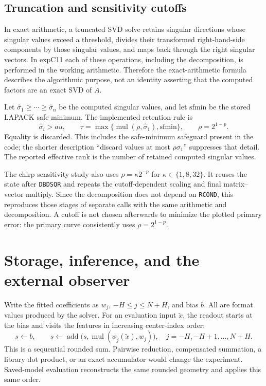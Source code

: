\documentclass[11pt]{article}
\newcommand{\add}{\operatorname{add}}
\newcommand{\mul}{\operatorname{mul}}
\newcommand{\code}[1]{\texttt{#1}}
\begin{document}
\subsection{Truncation and sensitivity cutoffs}
In exact arithmetic, a truncated SVD solve retains singular directions whose
singular values exceed a threshold, divides their transformed right-hand-side
components by those singular values, and maps back through the right singular
vectors. In expC11 each of these operations, including the decomposition, is
performed in the working arithmetic. Therefore the exact-arithmetic formula
describes the algorithmic purpose, not an identity asserting that the computed
factors are an exact SVD of $A$.

Let $\widehat\sigma_1\ge\cdots\ge\widehat\sigma_n$ be the computed
singular values, and let $\mathrm{sfmin}$ be the stored LAPACK safe minimum.
The implemented retention rule is
\begin{equation}\label{eq:threshold}
 \widehat\sigma_i>	au,\qquad
 \tau=\max\{\mul(\rho,\widehat\sigma_1),\mathrm{sfmin}\},
 \qquad \rho=2^{1-p}.
\end{equation}
Equality is discarded. This includes the safe-minimum safeguard present in
the code; the shorter description ``discard values at most
$\rho\sigma_1$'' suppresses that detail. The reported effective rank is
the number of retained computed singular values.

The chirp sensitivity study also uses $\rho=\kappa2^{-p}$ for
$\kappa\in\{1,8,32\}$. It reuses the state after \code{DBDSQR} and repeats
the cutoff-dependent scaling and final matrix--vector multiply. Since the
decomposition does not depend on \code{RCOND}, this reproduces those stages
of separate calls with the same arithmetic and decomposition. A cutoff is
not chosen afterwards to minimize the plotted primary error: the primary
curve consistently uses $\rho=2^{1-p}$.

\section{Storage, inference, and the external observer}

Write the fitted coefficients as $w_j$, $-H\le j\le N+H$, and bias $b$.
All are format values produced by the solver. For an evaluation input
$\widetilde x$, the readout starts at the bias and visits the features in
increasing center-index order:
\begin{equation}\label{eq:readout}
 s\leftarrow b,\qquad
 s\leftarrow\add\bigl(s,\mul(\phi_j(\widetilde x),w_j)\bigr),
 \quad j=-H,-H+1,\ldots,N+H.
\end{equation}
This is a sequential rounded sum. Pairwise reduction, compensated summation,
a library dot product, or an exact accumulator would change the experiment.
Saved-model evaluation reconstructs the same rounded geometry and applies
this same order.
\end{document}
